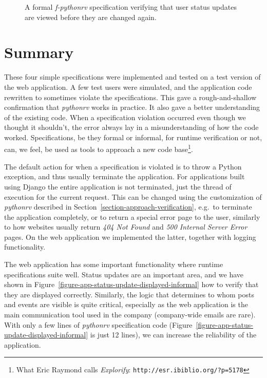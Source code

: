 \begin{figure}[h!]
	\begin{center}
	\begin{minipage}{0.9\textwidth}
	
	\end{minipage}
	\end{center}

  \caption{A formal \textit{f-pythonrv} specification verifying that user
    status updates are viewed before they are changed again.}
	\label{figure-app-status-update-viewed-formal}
\end{figure}


\section{Summary}

These four simple specifications were implemented and tested on a test version
of the web application. A few test users were simulated, and the application
code rewritten to sometimes violate the specifications. This gave a
rough-and-shallow confirmation that \textit{pythonrv} works in practice. It
also gave a better understanding of the existing code. When a specification
violation occurred even though we thought it shouldn't, the error always lay
in a misunderstanding of how the code worked. Specifications,
be they formal or informal, for runtime verification or not, can, we feel, be
used as tools to approach a new code base\footnote{What Eric Raymond calls
\textit{Explorify}: \texttt{http://esr.ibiblio.org/?p=5178}}.

The default action for when a specification is violated is to throw a Python
exception, and thus usually terminate the application. For applications built
using Django the entire application is not terminated, just the thread of
execution for the current request. This can be changed using the customization
of \textit{pythonrv} described in Section~\ref{section-approach-verification},
e.g.~to terminate the application completely, or to return a special error page
to the user, similarly to how websites usually return \textit{404 Not Found}
and \textit{500 Internal Server Error} pages. On the web application we
implemented the latter, together with logging functionality.

The web application has some important functionality where runtime
specifications suite well. Status updates are an important area, and we
have shown in Figure~\ref{figure-app-status-update-displayed-informal} how to
verify that they are displayed correctly. Similarly, the logic that
determines to whom posts and events are visible is quite critical, especially
as the web application is the main communication tool used in the company
(company-wide emails are rare). With only a few lines of \textit{pythonrv}
specification code (Figure~\ref{figure-app-status-update-displayed-informal} is
just 12 lines), we can increase the reliability of the application.
